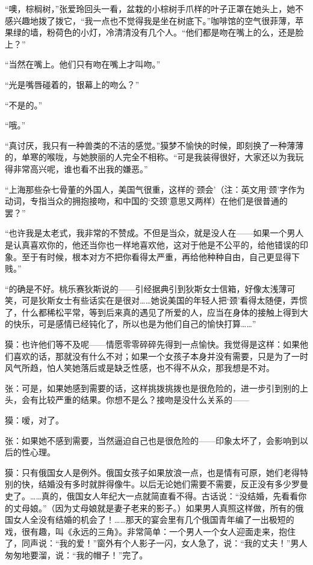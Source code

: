 \par “噢，棕榈树，”张爱玲回头一看，盆栽的小棕树手爪样的叶子正罩在她头上，她不感兴趣地拨了拨它，“我一点也不觉得我是坐在树底下。”咖啡馆的空气很菲薄，苹果绿的墙，粉荷色的小灯，冷清清没有几个人。“他们都是吻在嘴上的么，还是脸上？”
\par “当然在嘴上。他们只有吻在嘴上才叫吻。”
\par “光是嘴唇碰着的，银幕上的吻么？”
\par “不是的。”
\par “哦。”
\par “真讨厌，我只有一种兽类的不洁的感觉。”獏梦不愉快的时候，即刻换了一种薄薄的，单寒的喉咙，与她腴丽的人完全不相称。“可是我装得很好，大家还以为我玩得非常高兴呢，谁也看不出我的嫌恶。”
\par “上海那些杂七骨董的外国人，美国气很重，这样的‘颈会’（注：英文用‘颈’字作为动词，专指当众的拥抱接吻，和中国的‘交颈’意思又两样）在他们是很普通的罢？”
\par “也许我是太老式，我非常的不赞成。不但是当众，就是没人在——如果一个男人是认真喜欢你的，他还当你也一样地喜欢他，这对于他是不公平的，给他错误的印象。至于有时候，根本对方不把你看得太严重，再给他种种自由，自己更显得下贱。”
\par “的确是不好。桃乐赛狄斯说的——引经据典引到狄斯女士信箱，好像太浅薄可笑，可是狄斯女士有些话实在是很对……她说美国的年轻人把‘颈’看得太随便，弄惯了，什么都稀松平常，等到后来真的遇见了所爱的人，应当在身体的接触上得到大的快乐，可是感情已经钝化了，所以也是为他们自己的愉快打算……”
\par 獏：也许他们等不及呢——情愿零零碎碎先得到一点愉快。我觉得是这样：如果他们喜欢的话，那就没有什么不对；如果一个女孩子本身并没有需要，只是为了一时风气所趋，怕人笑她落后或是缺乏性感，也不得不从众，那我想是不对。
\par 张：可是，如果她感到需要的话，这样挑拨挑拨也是很危险的，进一步引到别的上头，会有比较严重的结果。你想不是么？接吻是没什么关系的——
\par 獏：嗳，对了。
\par 张：如果她不感到需要，当然逼迫自己也是很危险的——印象太坏了，会影响到以后的性心理。
\par 獏：只有俄国女人是例外。俄国女孩子如果放浪一点，也是情有可原，她们老得特别的快，结婚没有多时就胖得像牛。以后无论她们需要不需要，反正没有多少罗曼史了。……真的，俄国女人年纪大一点就简直看不得。古话说：“没结婚，先看看你的丈母娘。”（因为丈母娘就是妻子老来的影子。）如果男人真照这样做，所有的俄国女人全没有结婚的机会了！……那天的宴会里有几个俄国青年编了一出极短的戏，很有趣，叫《永远的三角》。非常简单：一个男人一个女人迎面走来，抱住了，同声说：“我的爱！”窗外有个人影子一闪，女人急了，说：“我的丈夫！”男人匆匆地要溜，说：“我的帽子！”完了。
